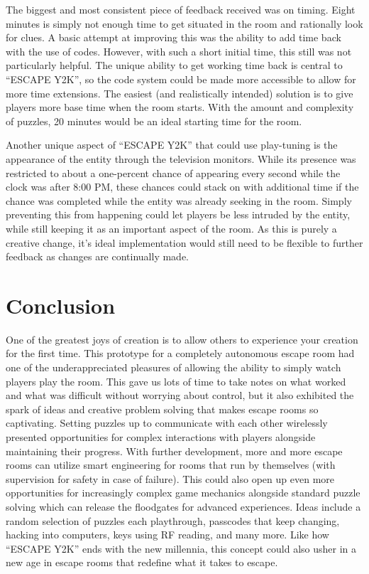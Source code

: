 \documentclass[conference]{IEEEtran}
\begin{document}
\indent The biggest and most consistent piece of feedback received was on timing. Eight minutes is simply not enough time to 
get situated in the room and rationally look for clues. A basic attempt at improving this was the ability to add time back 
with the use of codes. However, with such a short initial time, this still was not particularly helpful. The unique ability 
to get working time back is central to ``ESCAPE Y2K'', so the code system could be made more accessible to allow for more time 
extensions. The easiest (and realistically intended) solution is to give players more base time when the room starts. With the 
amount and complexity of puzzles, 20 minutes would be an ideal starting time for the room.

\indent Another unique aspect of ``ESCAPE Y2K'' that could use play-tuning is the appearance of the entity through the television 
monitors. While its presence was restricted to about a one-percent chance of appearing every second while the clock was after 
8:00 PM, these chances could stack on with additional time if the chance was completed while the entity was already seeking in 
the room. Simply preventing this from happening could let players be less intruded by the entity, while still keeping it as an 
important aspect of the room. As this is purely a creative change, it's ideal implementation would still need to be flexible to 
further feedback as changes are continually made.


\section{Conclusion} %

\indent One of the greatest joys of creation is to allow others to experience your creation for the first time. This prototype
for a completely autonomous escape room had one of the underappreciated pleasures of allowing the ability to simply watch players play the room.
This gave us lots of time to take notes on what worked and what was difficult without worrying about control, but it also exhibited
the spark of ideas and creative problem solving that makes escape rooms so captivating. Setting puzzles up to communicate with each other
wirelessly presented opportunities for complex interactions with players alongside maintaining their progress. With further development, more and more
escape rooms can utilize smart engineering for rooms that run by themselves (with supervision for safety in case of failure). This could also open up
even more opportunities for increasingly complex game mechanics alongside standard puzzle solving which can release the floodgates for advanced experiences. 
Ideas include a random selection of puzzles each playthrough, passcodes that keep changing, hacking into computers, keys using RF reading, and many more.
Like how ``ESCAPE Y2K'' ends with the new millennia, this concept could also usher in a new age in 
escape rooms that redefine what it takes to escape.
\end{document}
